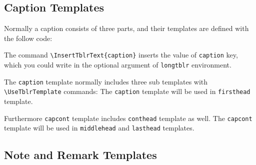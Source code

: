 \documentclass[oneside]{book}
\begin{document}
\begin{codehigh}
\end{codehigh}

\subsection{Caption Templates}

Normally a caption consists of three parts, and their templates are defined with the follow code:

\begin{codehigh}
\end{codehigh}

The command \verb!\InsertTblrText{caption}! inserts the value of \verb!caption! key,
which you could write in the optional argument of \verb!longtblr! environment.

The \verb!caption! template normally includes three sub templates with \verb!\UseTblrTemplate! commands:
The \verb!caption! template will be used in \verb!firsthead! template.

\begin{codehigh}
\end{codehigh}

Furthermore \verb!capcont! template includes \verb!conthead! template as well.
The \verb!capcont! template will be used in \verb!middlehead! and \verb!lasthead! templates.

\begin{codehigh}
\end{codehigh}

\subsection{Note and Remark Templates}
\end{document}
